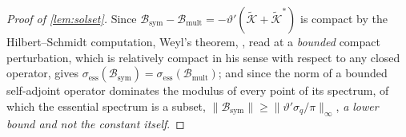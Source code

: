 \begin{proof}[Proof of \cref{lem:solset}]
Since
$\mathcal B_{\mathrm{sym}}-\mathcal B_{\mathrm{mult}}=-\vartheta'(\tilde{\mathcal K}+\tilde{\mathcal K}^\ast)$
is compact
by the Hilbert--Schmidt computation, Weyl's theorem, \citet[Thm.~IV.5.35]{kato1995}, read at a
\emph{bounded} compact perturbation, which is relatively compact in his sense with respect to any closed
operator, gives
$\sigma_{\mathrm{ess}}(\mathcal B_{\mathrm{sym}})=\sigma_{\mathrm{ess}}(\mathcal B_{\mathrm{mult}})$;
and since the norm of a
bounded self-adjoint operator dominates the modulus of every point of its spectrum, of which the
essential spectrum is a subset,
$\big\|\mathcal B_{\mathrm{sym}}\big\|\ge\big\|\vartheta'\sigma_q/\pi\big\|_\infty$, 
\emph{a lower bound and not the constant itself}.


\end{proof}
